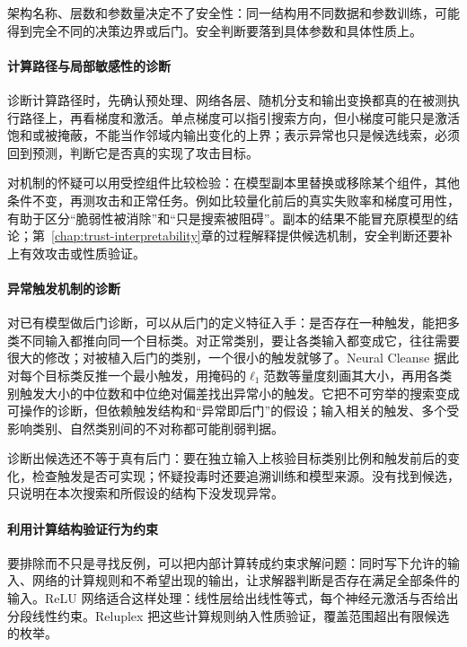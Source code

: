 架构名称、层数和参数量决定不了安全性：同一结构用不同数据和参数训练，可能得到完全不同的决策边界或后门。安全判断要落到具体参数和具体性质上。

\paragraph{计算路径与局部敏感性的诊断}

诊断计算路径时，先确认预处理、网络各层、随机分支和输出变换都真的在被测执行路径上，再看梯度和激活。单点梯度可以指引搜索方向，但小梯度可能只是激活饱和或被掩蔽，不能当作邻域内输出变化的上界；表示异常也只是候选线索，必须回到预测，判断它是否真的实现了攻击目标。

对机制的怀疑可以用受控组件比较检验：在模型副本里替换或移除某个组件，其他条件不变，再测攻击和正常任务。例如比较量化前后的真实失败率和梯度可用性，有助于区分“脆弱性被消除”和“只是搜索被阻碍”。副本的结果不能冒充原模型的结论；第~\ref{chap:trust-interpretability}章的过程解释提供候选机制，安全判断还要补上有效攻击或性质验证。

\paragraph{异常触发机制的诊断}

对已有模型做后门诊断，可以从后门的定义特征入手：是否存在一种触发，能把多类不同输入都推向同一个目标类。对正常类别，要让各类输入都变成它，往往需要很大的修改；对被植入后门的类别，一个很小的触发就够了。Neural Cleanse 据此对每个目标类反推一个最小触发，用掩码的$\ell_1$范数等量度刻画其大小，再用各类别触发大小的中位数和中位绝对偏差找出异常小的触发。它把不可穷举的搜索变成可操作的诊断，但依赖触发结构和“异常即后门”的假设；输入相关的触发、多个受影响类别、自然类别间的不对称都可能削弱判据。

诊断出候选还不等于真有后门：要在独立输入上核验目标类别比例和触发前后的变化，检查触发是否可实现；怀疑投毒时还要追溯训练和模型来源。没有找到候选，只说明在本次搜索和所假设的结构下没发现异常。

\paragraph{利用计算结构验证行为约束}

要排除而不只是寻找反例，可以把内部计算转成约束求解问题：同时写下允许的输入、网络的计算规则和不希望出现的输出，让求解器判断是否存在满足全部条件的输入。ReLU 网络适合这样处理：线性层给出线性等式，每个神经元激活与否给出分段线性约束。Reluplex 把这些计算规则纳入性质验证，覆盖范围超出有限候选的枚举。

